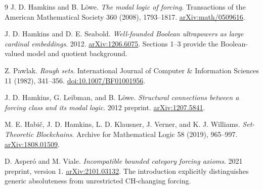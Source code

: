 \documentclass[11pt,letterpaper]{article}
\theoremstyle{definition}
\begin{document}
\clearpage
\begin{thebibliography}{9}
J. D. Hamkins and B. L\"owe.
\emph{The modal logic of forcing}.
Transactions of the American Mathematical Society 360 (2008), 1793--1817.
\href{https://arxiv.org/abs/math/0509616}{arXiv:math/0509616}.

J. D. Hamkins and D. E. Seabold.
\emph{Well-founded Boolean ultrapowers as large cardinal embeddings}.
2012.
\href{https://arxiv.org/abs/1206.6075}{arXiv:1206.6075}.
Sections 1--3 provide the Boolean-valued model and quotient background.

Z. Pawlak.
\emph{Rough sets}.
International Journal of Computer \& Information Sciences 11 (1982), 341--356.
\href{https://doi.org/10.1007/BF01001956}{doi:10.1007/BF01001956}.

J. D. Hamkins, G. Leibman, and B. L\"owe.
\emph{Structural connections between a forcing class and its modal logic}.
2012 preprint.
\href{https://arxiv.org/abs/1207.5841}{arXiv:1207.5841}.

M. E. Habi\v{c}, J. D. Hamkins, L. D. Klausner, J. Verner, and K. J. Williams.
\emph{Set-Theoretic Blockchains}.
Archive for Mathematical Logic 58 (2019), 965--997.
\href{https://arxiv.org/abs/1808.01509}{arXiv:1808.01509}.

D. Asper\'o and M. Viale.
\emph{Incompatible bounded category forcing axioms}.
2021 preprint, version 1.
\href{https://arxiv.org/abs/2101.03132}{arXiv:2101.03132}.
The introduction explicitly distinguishes generic absoluteness from unrestricted CH-changing forcing.
\end{thebibliography}
\end{document}

